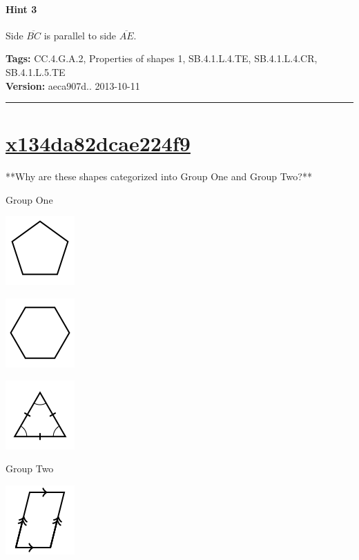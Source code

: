 \documentclass[twocolumn,10pt]{article}
\def\shrinkfactor{0.55}
\begin{document}
\paragraph{Hint 3}Side $\overline{BC}$ is parallel to side $\overline{AE}$.



\medskip
\noindent
\textbf{Tags:} {\footnotesize CC.4.G.A.2, Properties of shapes 1, SB.4.1.L.4.TE, SB.4.1.L.4.CR, SB.4.1.L.5.TE}\\
\textbf{Version:} aeca907d.. 2013-10-11
\smallskip\hrule





\section{\href{https://www.khanacademy.org/devadmin/content/items/x134da82dcae224f9}{x134da82dcae224f9}}

\noindent
**Why are these shapes categorized into Group One and Group Two?** 

Group One 



\includegraphics[scale=\shrinkfactor]{figures/498a6b09730fdba2360826c138eeee142e8cccc1.png}

\includegraphics[scale=\shrinkfactor]{figures/0245164f3f4897772e76d361f955075a80732b03.png}

\includegraphics[scale=\shrinkfactor]{figures/2e6355867a1027528f1719f9dcb578dcb221b055.png}


Group Two


\includegraphics[scale=\shrinkfactor]{figures/feaa75a1e077e1d8ea6873bc2a4aa206d3c95598.png}
\end{document}
